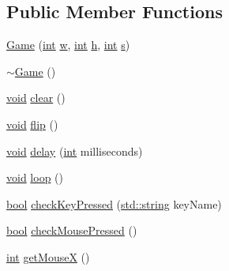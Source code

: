 \subsection*{Public Member Functions}
\begin{DoxyCompactItemize}
\item 
\mbox{\hyperlink{class_game_a12d537b50fbf7000e60c183411ac0142}{Game}} (\mbox{\hyperlink{warnings_8h_a74f207b5aa4ba51c3a2ad59b219a423b}{int}} \mbox{\hyperlink{_s_d_l__opengl__glext_8h_a6ee8f168a7ab6785a9bb57c6715dad99}{w}}, \mbox{\hyperlink{warnings_8h_a74f207b5aa4ba51c3a2ad59b219a423b}{int}} \mbox{\hyperlink{_s_d_l__opengl__glext_8h_afa0fb1b5e976920c0abeff2dca3ed774}{h}}, \mbox{\hyperlink{warnings_8h_a74f207b5aa4ba51c3a2ad59b219a423b}{int}} \mbox{\hyperlink{_s_d_l__opengl_8h_a4af680a6c683f88ed67b76f207f2e6e4}{s}})
\item 
\mbox{\hyperlink{class_game_ae3d112ca6e0e55150d2fdbc704474530}{$\sim$\+Game}} ()
\item 
\mbox{\hyperlink{_s_d_l__opengles2__gl2ext_8h_ae5d8fa23ad07c48bb609509eae494c95}{void}} \mbox{\hyperlink{class_game_a8ba8d7bcda356ed584dc445184320ff7}{clear}} ()
\item 
\mbox{\hyperlink{_s_d_l__opengles2__gl2ext_8h_ae5d8fa23ad07c48bb609509eae494c95}{void}} \mbox{\hyperlink{class_game_a1018ac77db757af6826cbd712da5e20e}{flip}} ()
\item 
\mbox{\hyperlink{_s_d_l__opengles2__gl2ext_8h_ae5d8fa23ad07c48bb609509eae494c95}{void}} \mbox{\hyperlink{class_game_a922b044ea75b008453028c334d8a6978}{delay}} (\mbox{\hyperlink{warnings_8h_a74f207b5aa4ba51c3a2ad59b219a423b}{int}} milliseconds)
\item 
\mbox{\hyperlink{_s_d_l__opengles2__gl2ext_8h_ae5d8fa23ad07c48bb609509eae494c95}{void}} \mbox{\hyperlink{class_game_a7ad92b77b596d7882a7ae76eb18b5e6c}{loop}} ()
\item 
\mbox{\hyperlink{asdl_8h_af6a258d8f3ee5206d682d799316314b1}{bool}} \mbox{\hyperlink{class_game_ac0e29588db21270fc613a2e2b6a209c5}{check\+Key\+Pressed}} (\mbox{\hyperlink{_s_d_l__opengl__glext_8h_ab4ccfaa8ab0e1afaae94dc96ef52dde1}{std\+::string}} key\+Name)
\item 
\mbox{\hyperlink{asdl_8h_af6a258d8f3ee5206d682d799316314b1}{bool}} \mbox{\hyperlink{class_game_a3713033ec8d0e8bb80c6cb9fdbb596df}{check\+Mouse\+Pressed}} ()
\item 
\mbox{\hyperlink{warnings_8h_a74f207b5aa4ba51c3a2ad59b219a423b}{int}} \mbox{\hyperlink{class_game_ad8d6d28b0469587b7641d9f706c35e0c}{get\+MouseX}} ()
\item 

\end{DoxyCompactItemize}
